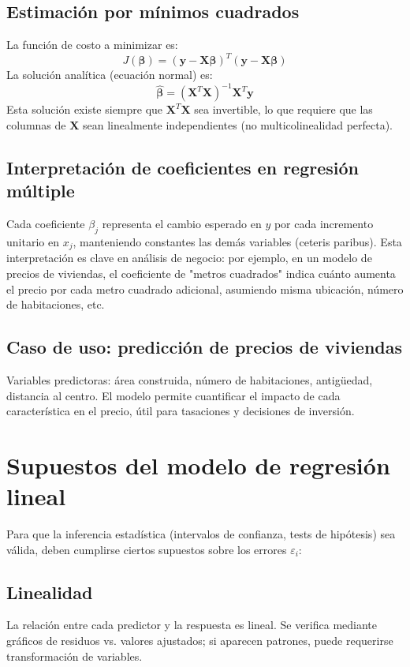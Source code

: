 \documentclass[12pt,a4paper,openany,oneside]{book}
\begin{document}
\subsection{Estimación por mínimos cuadrados}
La función de costo a minimizar es:
\[
J(\boldsymbol{\beta}) = (\mathbf{y} - \mathbf{X}\boldsymbol{\beta})^T (\mathbf{y} - \mathbf{X}\boldsymbol{\beta})
\]
La solución analítica (ecuación normal) es:
\[
\hat{\boldsymbol{\beta}} = (\mathbf{X}^T \mathbf{X})^{-1} \mathbf{X}^T \mathbf{y}
\]
Esta solución existe siempre que \(\mathbf{X}^T \mathbf{X}\) sea invertible, lo que requiere que las columnas de \(\mathbf{X}\) sean linealmente independientes (no multicolinealidad perfecta).

\subsection{Interpretación de coeficientes en regresión múltiple}
Cada coeficiente \(\beta_j\) representa el cambio esperado en \(y\) por cada incremento unitario en \(x_j\), manteniendo constantes las demás variables (ceteris paribus). Esta interpretación es clave en análisis de negocio: por ejemplo, en un modelo de precios de viviendas, el coeficiente de "metros cuadrados" indica cuánto aumenta el precio por cada metro cuadrado adicional, asumiendo misma ubicación, número de habitaciones, etc.

\subsection{Caso de uso: predicción de precios de viviendas}
Variables predictoras: área construida, número de habitaciones, antigüedad, distancia al centro. El modelo permite cuantificar el impacto de cada característica en el precio, útil para tasaciones y decisiones de inversión.

\section{Supuestos del modelo de regresión lineal}
Para que la inferencia estadística (intervalos de confianza, tests de hipótesis) sea válida, deben cumplirse ciertos supuestos sobre los errores \(\varepsilon_i\):

\subsection{Linealidad}
La relación entre cada predictor y la respuesta es lineal. Se verifica mediante gráficos de residuos vs. valores ajustados; si aparecen patrones, puede requerirse transformación de variables.
\end{document}
